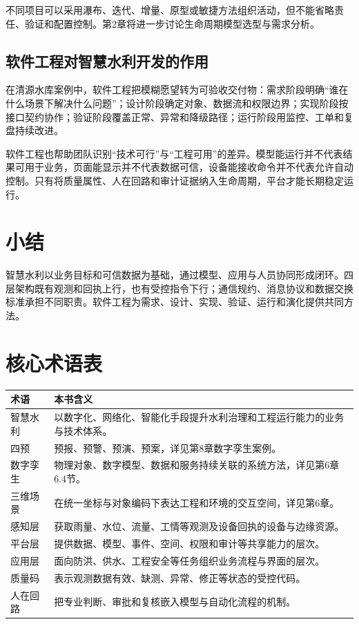 不同项目可以采用瀑布、迭代、增量、原型或敏捷方法组织活动，但不能省略责任、验证和配置控制。第2章将进一步讨论生命周期模型选型与需求分析。

\subsection{软件工程对智慧水利开发的作用}

在清源水库案例中，软件工程把模糊愿望转为可验收交付物：需求阶段明确“谁在什么场景下解决什么问题”；设计阶段确定对象、数据流和权限边界；实现阶段按接口契约协作；验证阶段覆盖正常、异常和降级路径；运行阶段用监控、工单和复盘持续改进。

软件工程也帮助团队识别“技术可行”与“工程可用”的差异。模型能运行并不代表结果可用于业务，页面能显示并不代表数据可信，设备能接收命令并不代表允许自动控制。只有将质量属性、人在回路和审计证据纳入生命周期，平台才能长期稳定运行。

\section*{小结}

智慧水利以业务目标和可信数据为基础，通过模型、应用与人员协同形成闭环。四层架构既有观测和回执上行，也有受控指令下行；通信规约、消息协议和数据交换标准承担不同职责。软件工程为需求、设计、实现、验证、运行和演化提供共同方法。

\section*{核心术语表}

\begin{longtable}{p{2.6cm}p{10.0cm}}
\toprule
术语 & 本书含义 \\
\midrule
智慧水利 & 以数字化、网络化、智能化手段提升水利治理和工程运行能力的业务与技术体系。\\
四预 & 预报、预警、预演、预案，详见第8章数字孪生案例。\\
数字孪生 & 物理对象、数字模型、数据和服务持续关联的系统方法，详见第6章6.4节。\\
三维场景 & 在统一坐标与对象编码下表达工程和环境的交互空间，详见第6章。\\
感知层 & 获取雨量、水位、流量、工情等观测及设备回执的设备与边缘资源。\\
平台层 & 提供数据、模型、事件、空间、权限和审计等共享能力的层次。\\
应用层 & 面向防洪、供水、工程安全等任务组织业务流程与界面的层次。\\
质量码 & 表示观测数据有效、缺测、异常、修正等状态的受控代码。\\
人在回路 & 把专业判断、审批和复核嵌入模型与自动化流程的机制。\\
\bottomrule
\end{longtable}

